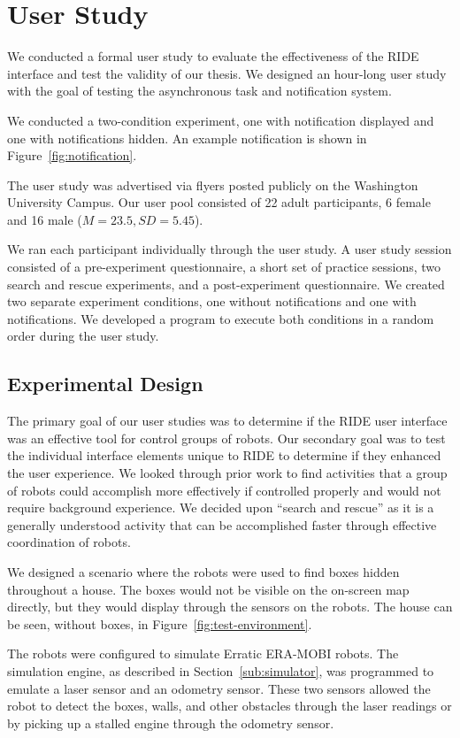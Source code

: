 \chapter{User Study}
We conducted a formal user study to evaluate the effectiveness of the RIDE interface and test the validity of our thesis. We designed an hour-long user study with the goal of testing the asynchronous task and notification system.

We conducted a two-condition experiment, one with notification displayed and one with notifications hidden. An example notification is shown in Figure~\ref{fig:notification}. 

The user study was advertised via flyers posted publicly on the Washington University Campus. Our user pool consisted of 22 adult participants, 6 female and 16 male ($M=23.5, SD=5.45$).

We ran each participant individually through the user study. A user study session consisted of a pre-experiment questionnaire, a short set of practice sessions, two search and rescue experiments, and a post-experiment questionnaire. We created two separate experiment conditions, one without notifications and one with notifications. We developed a program to execute both conditions in a random order during the user study.

\section{Experimental Design}
The primary goal of our user studies was to determine if the RIDE user interface was an effective tool for control groups of robots. Our secondary goal was to test the individual interface elements unique to RIDE to determine if they enhanced the user experience. We looked through prior work to find activities that a group of robots could accomplish more effectively if controlled properly and would not require background experience. We decided upon ``search and rescue'' as it is a generally understood activity that can be accomplished faster through effective coordination of robots. 

We designed a scenario where the robots were used to find boxes hidden throughout a house. The boxes would not be visible on the on-screen map directly, but they would display through the sensors on the robots. The house can be seen, without boxes, in Figure~\ref{fig:test-environment}. 

The robots were configured to simulate Erratic ERA-MOBI robots. The simulation engine, as described in Section~\ref{sub:simulator}, was programmed to emulate a laser sensor and an odometry sensor. These two sensors allowed the robot to detect the boxes, walls, and other obstacles through the laser readings or by picking up a stalled engine through the odometry sensor.

